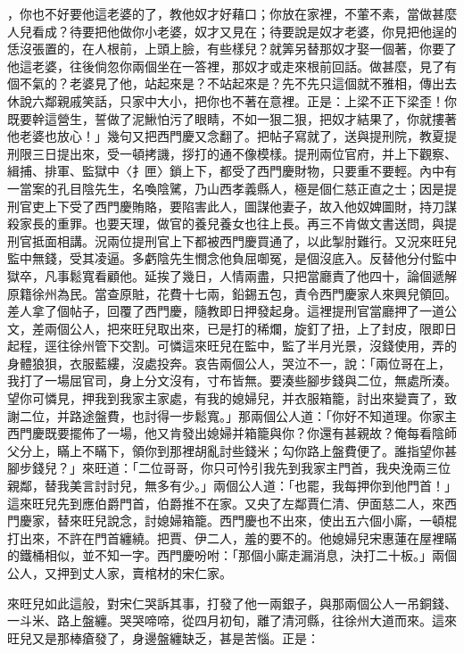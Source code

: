 ，你也不好要他這老婆的了，教他奴才好藉口；你放在家裡，不葷不素，當做甚麼人兒看成？待要把他做你小老婆，奴才又見在；待要說是奴才老婆，你見把他逞的恁沒張置的，在人根前，上頭上臉，有些樣兒？就筭另替那奴才娶一個著，你要了他這老婆，往後倘忽你兩個坐在一答裡，那奴才或走來根前回話。做甚麼，見了有個不氣的？老婆見了他，站起來是？不站起來是？先不先只這個就不雅相，傳出去休說六鄰親戚笑話，只家中大小，把你也不著在意裡。正是：上梁不正下梁歪！你既要幹這營生，誓做了泥鰍怕污了眼睛，不如一狠二狠，把奴才結果了，你就摟著他老婆也放心！」幾句又把西門慶又念翻了。把帖子寫就了，送與提刑院，教夏提刑限三日提出來，受一頓拷譏，拶打的通不像模樣。提刑兩位官府，并上下觀察、緝捕、排軍、監獄中〈扌匣〉鎖上下，都受了西門慶財物，只要重不要輕。內中有一當案的孔目陰先生，名喚陰騭，乃山西孝義縣人，極是個仁慈正直之士；因是提刑官吏上下受了西門慶賄賂，要陷害此人，圖謀他妻子，故入他奴婢圖財，持刀謀殺家長的重罪。也要天理，做官的養兒養女也往上長。再三不肯做文書送問，與提刑官抵面相講。況兩位提刑官上下都被西門慶買通了，以此掣肘難行。又況來旺兒監中無錢，受其凌逼。多虧陰先生憫念他負屈啣冤，是個沒底入。反替他分付監中獄卒，凡事鬆寬看顧他。延挨了幾日，人情兩盡，只把當廳責了他四十，論個遞解原籍徐州為民。當查原賍，花費十七兩，鉛錫五包，責令西門慶家人來興兒領回。差人拿了個帖子，回覆了西門慶，隨教即日押發起身。這裡提刑官當廳押了一道公文，差兩個公人，把來旺兒取出來，已是打的稀爛，旋釘了扭，上了封皮，限即日起程，逕往徐州管下交割。可憐這來旺兒在監中，監了半月光景，沒錢使用，弄的身體狼狽，衣服藍縷，沒處投奔。哀告兩個公人，哭泣不一，說：「兩位哥在上，我打了一場屈官司，身上分文沒有，寸布皆無。要湊些腳步錢與二位，無處所湊。望你可憐見，押我到我家主家處，有我的媳婦兒，并衣服箱籠，討出來變賣了，致謝二位，并路途盤費，也討得一步鬆寬。」那兩個公人道：「你好不知道理。你家主西門慶既要擺佈了一場，他又肯發出媳婦并箱籠與你？你還有甚親故？俺每看陰師父分上，瞞上不瞞下，領你到那裡胡亂討些錢米；勾你路上盤費便了。誰指望你甚腳步錢兒？」來旺道：「二位哥哥，你只可忴引我先到我家主門首，我央浼兩三位親鄰，替我美言討討兒，無多有少。」兩個公人道：「也罷，我每押你到他門首！」這來旺兒先到應伯爵門首，伯爵推不在家。又央了左鄰賈仁清、伊面慈二人，來西門慶家，替來旺兒說念，討媳婦箱籠。西門慶也不出來，使出五六個小廝，一頓棍打出來，不許在門首纏繞。把賈、伊二人，羞的要不的。他媳婦兒宋惠蓮在屋裡瞞的鐵桶相似，並不知一字。西門慶吩咐：「那個小廝走漏消息，決打二十板。」兩個公人，又押到丈人家，賣棺材的宋仁家。

來旺兒如此這般，對宋仁哭訴其事，打發了他一兩銀子，與那兩個公人一吊銅錢、一斗米、路上盤纏。哭哭啼啼，從四月初旬，離了清河縣，往徐州大道而來。這來旺兒又是那棒瘡發了，身邊盤纏缺乏，甚是苦惱。正是：

